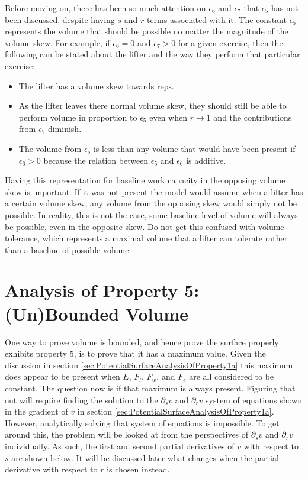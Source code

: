 Before moving on, there has been so much attention on $\epsilon_6$ and $\epsilon_7$ that $\epsilon_5$ has not been discussed, despite having $s$ and $r$ terms associated with it. The constant $\epsilon_5$ represents the volume that should be possible no matter the magnitude of the volume skew. For example, if $\epsilon_6=0$ and $\epsilon_7>0$ for a given exercise, then the following can be stated about the lifter and the way they perform that particular exercise:

\begin{itemize}
    \item The lifter has a volume skew towards reps.
    \item As the lifter leaves there normal volume skew, they should still be able to perform volume in proportion to $\epsilon_5$ even when $r\to 1$ and the contributions from $\epsilon_7$ diminish.
    \item The volume from $\epsilon_5$ is less than any volume that would have been present if $\epsilon_6>0$ because the relation between $\epsilon_5$ and $\epsilon_6$ is additive.
\end{itemize}

Having this representation for baseline work capacity in the opposing volume skew is important. If it was not present the model would assume when a lifter has a certain volume skew, any volume from the opposing skew would simply not be possible. In reality, this is not the case, some baseline level of volume will always be possible, even in the opposite skew. Do not get this confused with volume tolerance, which represents a maximal volume that a lifter can tolerate rather than a baseline of possible volume.

\section{Analysis of Property 5: (Un)Bounded Volume}
\label{sec:PotentialSurfaceUnboundedVolume}

One way to prove volume is bounded, and hence prove the surface properly exhibits property 5, is to prove that it has a maximum value. Given the discussion in section \ref{sec:PotentialSurfaceAnalysisOfProperty1a} this maximum does appear to be present when $E$, $F_l$, $F_w$, and $F_e$ are all considered to be constant. The question now is if that maximum is always present. Figuring that out will require finding the solution to the $\partial_sv$ and $\partial_rv$ system of equations shown in the gradient of $v$ in section \ref{sec:PotentialSurfaceAnalysisOfProperty1a}. However, analytically solving that system of equations is impossible. To get around this, the problem will be looked at from the perspectives of $\partial_sv$ and $\partial_rv$ individually. As such, the first and second partial derivatives of $v$ with respect to $s$ are shown below. It will be discussed later what changes when the partial derivative with respect to $r$ is chosen instead.

